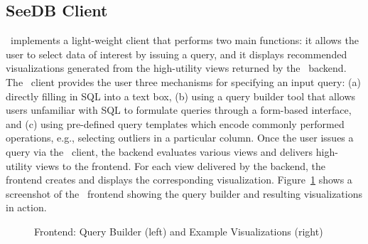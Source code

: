 

\subsection{SeeDB Client}
\label{sec:SeeDB_frontend}
\SeeDB\ implements a light-weight client that performs two main functions: it
allows the user to select data of interest by issuing a query, 
and it displays recommended visualizations generated from the high-utility views 
returned by the \SeeDB\ backend.
The \SeeDB\ client provides the user three mechanisms for specifying an input query: 
(a) directly filling in SQL into a text box, 
(b) using a query builder tool that allows users
unfamiliar with SQL to formulate queries through a form-based interface, and (c)
using pre-defined query templates which encode commonly performed operations,
e.g., selecting outliers in a particular column. 
Once the user issues a query via the \SeeDB\ client, the backend
evaluates various views and delivers high-utility views to the frontend.
For each view delivered by the backend, the frontend creates and displays the 
corresponding visualization.
Figure~\ref{fig:frontend1} shows a screenshot of the \SeeDB\ frontend showing
the query builder and resulting visualizations in action.
 
\begin{figure}[htb]
\vspace{-15pt}
\centerline{
\hbox{}
\hbox{}}
\vspace{-15pt}
\caption{Frontend: Query Builder (left) and Example Visualizations
(right)}
\label{fig:frontend1}
\vspace{-10pt}
\end{figure} 

